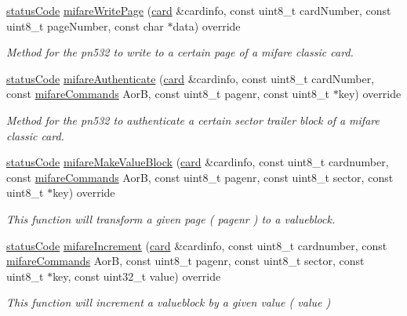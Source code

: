 \begin{DoxyCompactItemize}
\hyperlink{declarations_8h_ae1d20c5a38cae82ccaa6a77be3fd264b}{status\+Code} \hyperlink{classnfc_1_1PN532__chip_a2abf2e6dfabc2ca86eeb6c1edbfccb84}{mifare\+Write\+Page} (\hyperlink{classcard}{card} \&cardinfo, const uint8\+\_\+t card\+Number, const uint8\+\_\+t page\+Number, const char $\ast$data) override
\begin{DoxyCompactList}\small\item\em Method for the pn532 to write to a certain page of a mifare classic card. \end{DoxyCompactList}\item 
\hyperlink{declarations_8h_ae1d20c5a38cae82ccaa6a77be3fd264b}{status\+Code} \hyperlink{classnfc_1_1PN532__chip_a9737b9cf574ec198bcc0f9f42f50d882}{mifare\+Authenticate} (\hyperlink{classcard}{card} \&cardinfo, const uint8\+\_\+t card\+Number, const \hyperlink{declarations_8h_a305b1a3bcfca65e2a82f0f9d24676835}{mifare\+Commands} AorB, const uint8\+\_\+t pagenr, const uint8\+\_\+t $\ast$key) override
\begin{DoxyCompactList}\small\item\em Method for the pn532 to authenticate a certain sector trailer block of a mifare classic card. \end{DoxyCompactList}\item 
\hyperlink{declarations_8h_ae1d20c5a38cae82ccaa6a77be3fd264b}{status\+Code} \hyperlink{classnfc_1_1PN532__chip_aed07d1cf07fc0e2a277df1a80a1335c6}{mifare\+Make\+Value\+Block} (\hyperlink{classcard}{card} \&cardinfo, const uint8\+\_\+t cardnumber, const \hyperlink{declarations_8h_a305b1a3bcfca65e2a82f0f9d24676835}{mifare\+Commands} AorB, const uint8\+\_\+t pagenr, const uint8\+\_\+t sector, const uint8\+\_\+t $\ast$key) override
\begin{DoxyCompactList}\small\item\em This function will transform a given page ( pagenr ) to a valueblock. \end{DoxyCompactList}\item 
\hyperlink{declarations_8h_ae1d20c5a38cae82ccaa6a77be3fd264b}{status\+Code} \hyperlink{classnfc_1_1PN532__chip_aca0f8a430afe385c102740a0aedd54e8}{mifare\+Increment} (\hyperlink{classcard}{card} \&cardinfo, const uint8\+\_\+t cardnumber, const \hyperlink{declarations_8h_a305b1a3bcfca65e2a82f0f9d24676835}{mifare\+Commands} AorB, const uint8\+\_\+t pagenr, const uint8\+\_\+t sector, const uint8\+\_\+t $\ast$key, const uint32\+\_\+t value) override
\begin{DoxyCompactList}\small\item\em This function will increment a valueblock by a given value ( value ) \end{DoxyCompactList}\item 

\end{DoxyCompactItemize}
